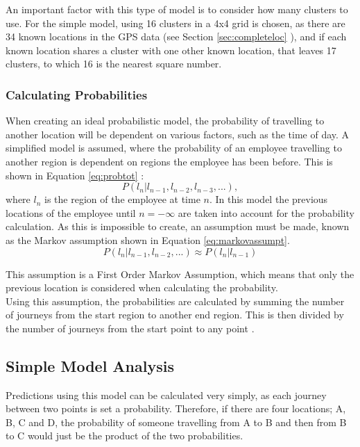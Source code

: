 \noindent An important factor with this type of model is to consider how many clusters to use. For the simple model, using 16 clusters in a 4x4 grid is chosen, as there are 34 known locations in the GPS data (see Section \ref{sec:completeloc} ), and if each known location shares a cluster with one other known location, that leaves 17 clusters, to which 16 is the nearest square number.

\subsubsection{Calculating Probabilities}

When creating an ideal probabilistic model, the probability of travelling to another location will be dependent on various factors, such as the time of day. A simplified model is assumed, where the probability of an employee travelling to another region is dependent on regions the employee has been before. This is shown in Equation \ref{eq:probtot} :
\begin{equation}\label{eq:probtot}P(l_n | l_{n-1}, l_{n-2}, l_{n-3}, ...),\end{equation}
where $l_n$ is the region of the employee at time $n$. In this model the previous locations of the employee until $n=-\infty$ are taken into account for the probability calculation. As this is impossible to create, an assumption must be made, known as the Markov assumption shown in Equation \ref{eq:markovassumpt}\cite{markov}. %
\begin{equation}\label{eq:markovassumpt}P(l_n | l_{n-1}, l_{n-2}, ...)\approx P(l_n | l_{n-1})\end{equation}

\noindent This assumption is a First Order Markov Assumption, which means that only the previous location is considered when calculating the probability.\\
\noindent Using this assumption, the probabilities are calculated by summing the number of journeys from the start region to another end region. This is then divided by the number of journeys from the start point to any point  \cite{gpspredict}.\\ 
 

\subsection{Simple Model Analysis}
\label{sec:simpleanalysis}
Predictions using this model can be calculated very simply, as each journey between two points is set a probability. Therefore, if there are four locations; A, B, C and D, the probability of someone travelling from A to B and then from B to C would just be the product of the two probabilities. \\

